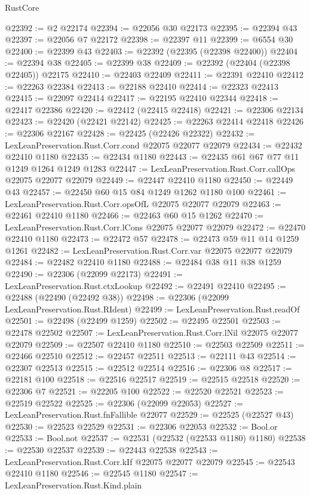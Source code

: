 \begin{lexlean}{RustCore}
\begin{coremodule}
@22392 := @2 @22174
@22394 := @22056 @30 @22173
@22395 := @22394 @43
@22397 := @22056 @7 @22172
@22398 := @22397 @11
@22399 := @6554 @30
@22400 := @22399 @43
@22403 := @22392 (@22395 (@22398 @22400))
@22404 := @22394 @38
@22405 := @22399 @38
@22409 := @22392 (@22404 (@22398 @22405)) @22175
@22410 := @22403 @22409
@22411 := @22391 @22410
@22412 := @22263 @22384
@22413 := @22188 @22410
@22414 := @22323 @22413
@22415 := @22097 @22414
@22417 := @22195 @22410 @22344
@22418 := @22417 @22386
@22420 := @22412 (@22415 @22418)
@22421 := @22306 @22134
@22423 := @22420 (@22421 @22142)
@22425 := @22263 @22414 @22418
@22426 := @22306 @22167
@22428 := @22425 (@22426 @22322)
@22432 := LexLeanPreservation.Rust.Corr.cond @22075 @22077 @22079
@22434 := @22432 @22410 @1180
@22435 := @22434 @1180
@22443 := @22435 @61 @67 @77 @11 @1249 @1264 @1249 @1283
@22447 := LexLeanPreservation.Rust.Corr.callOps @22075 @22077 @22079
@22449 := @22447 @22410 @1180
@22450 := @22449 @43
@22457 := @22450 @60 @15 @84 @1249 @1262 @1180 @100
@22461 := LexLeanPreservation.Rust.Corr.opsOfL @22075 @22077 @22079
@22463 := @22461 @22410 @1180
@22466 := @22463 @60 @15 @1262
@22470 := LexLeanPreservation.Rust.Corr.lCons @22075 @22077 @22079
@22472 := @22470 @22410 @1180
@22473 := @22472 @57
@22478 := @22473 @59 @11 @14 @1259 @1261
@22482 := LexLeanPreservation.Rust.Corr.var @22075 @22077 @22079
@22484 := @22482 @22410 @1180
@22488 := @22484 @38 @11 @38 @1259
@22490 := @22306 (@22099 @22173)
@22491 := LexLeanPreservation.Rust.ctxLookup
@22492 := @22491 @22410
@22495 := @22488 (@22490 (@22492 @38))
@22498 := @22306 (@22099 LexLeanPreservation.Rust.RIdent)
@22499 := LexLeanPreservation.Rust.readOf
@22501 := @22498 (@22499 @1259)
@22502 := @22495 @22501
@22503 := @22478 @22502
@22507 := LexLeanPreservation.Rust.Corr.lNil @22075 @22077 @22079
@22509 := @22507 @22410 @1180
@22510 := @22503 @22509
@22511 := @22466 @22510
@22512 := @22457 @22511
@22513 := @22111 @43
@22514 := @22307 @22513
@22515 := @22512 @22514
@22516 := @22306 @8
@22517 := @22181 @100
@22518 := @22516 @22517
@22519 := @22515 @22518
@22520 := @22306 @7
@22521 := @22205 @100
@22522 := @22520 @22521
@22523 := @22519 @22522
@22525 := @22306 (@22099 @22053)
@22527 := LexLeanPreservation.Rust.fnFallible @22077
@22529 := @22525 (@22527 @43)
@22530 := @22523 @22529
@22531 := @22306 @22053
@22532 := Bool.or
@22533 := Bool.not
@22537 := @22531 (@22532 (@22533 @1180) @1180)
@22538 := @22530 @22537
@22539 := @22443 @22538
@22543 := LexLeanPreservation.Rust.Corr.kIf @22075 @22077 @22079
@22545 := @22543 @22410 @1180
@22546 := @22545 @1180
@22547 := LexLeanPreservation.Rust.Kind.plain

\end{coremodule}
\end{lexlean}
